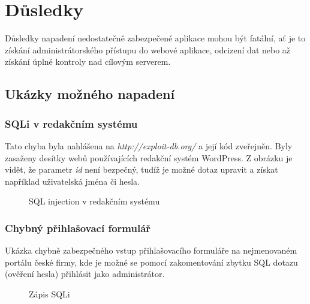 \documentclass[12pt, a4paper]{report}
\begin{document}
\chapter{Důsledky}
Důsledky napadení nedostatečně zabezpečené aplikace mohou být fatální, ať je to získání administrátorského přístupu do webové aplikace, odcizení dat nebo až získání úplné kontroly nad cílovým serverem.

\section{Ukázky možného napadení}
\subsection{SQLi v redakčním systému}
Tato chyba byla nahlášena na \textit{http://exploit-db.org/} a její kód zveřejněn. Byly zasaženy desítky webů používajících redakční systém WordPress. Z obrázku je vidět, že parametr \textit{id} není bezpečný, tudíž je možné dotaz upravit a získat například uživatelská jména či  hesla.
\begin{figure}[h!]
\caption{SQL injection v redakčním systému}
\label{obr.squash}
\end{figure}

\subsection{Chybný přihlašovací formulář}
Ukázka chybně zabezpečného vstup přihlašovacího formuláře na nejmenovaném portálu české firmy, kde je možné se pomocí zakomentování zbytku SQL dotazu (ověření hesla) přihlásit jako administrátor.
\begin{figure}[h!]
\caption{Zápis SQLi}
\label{obr.login1}
\end{figure}
\end{document}
